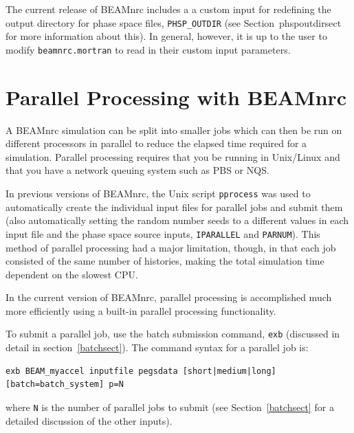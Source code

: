 \documentclass[12pt,twoside]{article}
\begin{document}
The current release of BEAMnrc includes a
a custom input for
redefining the output directory for
phase space files, {\tt PHSP\_OUTDIR}
(see Section~{phspoutdirsect} for more information about this).
In general, however, it is up to the user to
modify {\tt beamnrc.mortran} to read in
their custom input parameters.

\section[Parallel Processing]{Parallel Processing with BEAMnrc}
\label{parallelcalc}

A BEAMnrc simulation can be split into smaller jobs which can then be run
on different processors in parallel to reduce the elapsed time required
for a simulation.  Parallel processing requires that you be running
in Unix/Linux and that you have a network queuing system such as PBS or
NQS.

In previous versions of BEAMnrc, the Unix script {\tt pprocess} was used
to automatically create the individual input files for parallel
jobs and submit them (also automatically setting the random number
seeds to a different values in each input file and the phase space
 
source inputs, {\tt IPARALLEL} and {\tt PARNUM}).  This method
of parallel processing had a major limitation, though, in that each
job consisted of the same number of histories, making the total
simulation time dependent on the slowest CPU.

In the current version of BEAMnrc, parallel processing
is accomplished much more efficiently using a built-in
parallel processing functionality.

To submit a parallel job, use the batch submission command,
{\tt exb} (discussed in
detail in section~\ref{batchsect}).  The command syntax for a parallel job is:
\begin{verbatim}
exb BEAM_myaccel inputfile pegsdata [short|medium|long] [batch=batch_system] p=N
\end{verbatim}
where {\tt N} is the number of parallel jobs to submit (see
Section~\ref{batchsect} for a detailed discussion of the other inputs).
\end{document}
